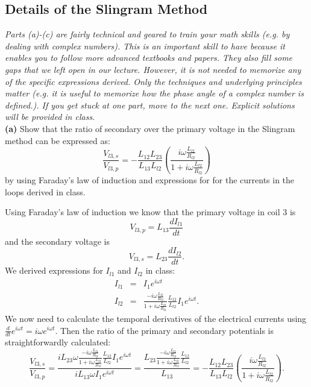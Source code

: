 \subsection{Details of the Slingram Method}
\textit{Parts (a)-(c) are fairly technical and geared to train your math skills (e.g. by dealing with complex numbers). This is an important skill to have because it enables you to follow more advanced textbooks and papers. They also fill some gaps that we left open in our lecture. However, it is not needed to memorize any of the specific expressions derived. Only the techniques and underlying principles matter (e.g. it is useful to memorize how the phase angle of a complex number is defined.). If you get stuck at one part, move to the next one. Explicit solutions will be provided in class.}\\

\textbf{(a)} Show that the ratio of secondary over the primary voltage in the Slingram method can be expressed as:
$$
 \frac{V_{l3,s}}{V_{l3,p}} = -\frac{L_{12}L_{23}}{L_{13}L_{l2}}\left(\frac{i\omega \frac{L_{l2}}{R_{l2}}}{1+i\omega\frac{L_{l2}}{R_{l2}}}\right)
$$
by using Faraday's law of induction and expressions for for the currents in the loops derived in class.   
\ifanswers
    \begin{tcolorbox}[enhanced jigsaw,breakable,pad at break*=1mm,
    colback=blue!5!white,colframe=babyblueeyes,title=Solutions,
    watermark color=white]
   
    Using Faraday's law of induction we know that the primary voltage in coil 3 is
    $$V_{l3,p} = L_{13}\frac{dI_{l1}}{dt}$$
    and the secondary voltage is
    $$V_{l3,s} = L_{23}\frac{dI_{l2}}{dt}.$$
    We derived expressions for $I_{l1}$ and $I_{l2}$ in class:
    \begin{eqnarray*}
    I_{l1} &=& I_1e^{i\omega t} \\
    I_{l2} &=& \frac{-i\omega \frac{L_{l2}}{R_{l2}}}{1+i\omega \frac{L_{l2}}{R_{l2}}}\frac{L_{12}}{L_{l2}}I_1e^{i\omega t}.
    \end{eqnarray*}
    We now need to calculate the temporal derivatives of the electrical currents using $\frac{d}{dt}e^{i\omega t} = i\omega e^{i\omega t}$. Then the ratio of the primary and secondary potentials is straightforwardly calculated:
    $$
    \frac{V_{l3,s}}{V_{l3,p}} = \frac{iL_{23}\omega \frac{-i\omega \frac{L_{l2}}{R_{l2}}}{1+i\omega \frac{L_{l2}}{R_{l2}}}\frac{L_{12}}{L_{l2}}I_1e^{i\omega t} }{iL_{13}\omega I_1 e^{i\omega t}} = \frac{L_{23} \frac{-i\omega \frac{L_{l2}}{R_{l2}}}{1+i\omega \frac{L_{l2}}{R_{l2}}}\frac{L_{12}}{L_{l2}}}{L_{13}} = -\frac{L_{12}L_{23}}{L_{13}L_{l2}}\left(\frac{i\omega \frac{L_{l2}}{R_{l2}}}{1+i\omega\frac{L_{l2}}{R_{l2}}}\right)
    .$$
\end{tcolorbox}
\fi

